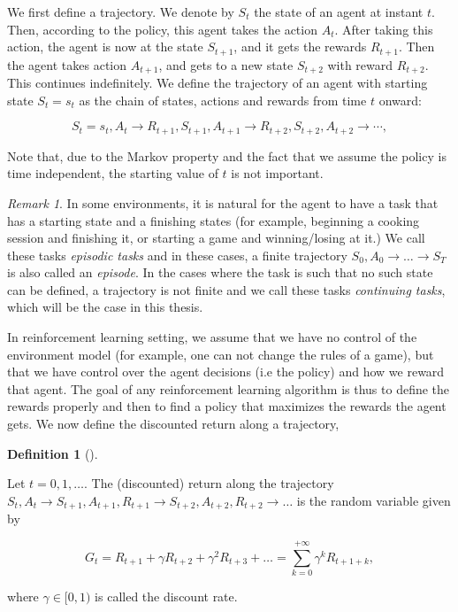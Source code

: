 \documentclass[
  letterpaper,
]{report}
\theoremstyle{plain}
\theoremstyle{definition}
\theoremstyle{definition}
\newtheorem{definition}{Definition}[chapter]
\theoremstyle{remark}
\newtheorem*{remark}{Remark}
\begin{document}
We first define a trajectory. We denote by \(S_t\) the state of an agent
at instant \(t\). Then, according to the policy, this agent takes the
action \(A_t\). After taking this action, the agent is now at the state
\(S_{t+1}\), and it gets the rewards \(R_{t+1}\). Then the agent takes
action \(A_{t+1}\), and gets to a new state \(S_{t+2}\) with reward
\(R_{t+2}\). This continues indefinitely. We define the trajectory of an
agent with starting state \(S_t = s_t\) as the chain of states, actions
and rewards from time \(t\) onward:

\[
S_t = s_t,A_t \to R_{t+1},S_{t+1},A_{t+1} \to R_{t+2},S_{t+2},A_{t+2} \to \cdots,
\]

Note that, due to the Markov property and the fact that we assume the
policy is time independent, the starting value of \(t\) is not
important.

\begin{remark}

In some environments, it is natural for the agent to have a task that
has a starting state and a finishing states (for example, beginning a
cooking session and finishing it, or starting a game and winning/losing
at it.) We call these tasks \emph{episodic tasks} and in these cases, a
finite trajectory \(S_0,A_0 \to \dots \to S_T\) is also called an
\emph{episode}. In the cases where the task is such that no such state
can be defined, a trajectory is not finite and we call these tasks
\emph{continuing tasks}, which will be the case in this thesis.

\end{remark}

In reinforcement learning setting, we assume that we have no control of
the environment model (for example, one can not change the rules of a
game), but that we have control over the agent decisions (i.e the
policy) and how we reward that agent. The goal of any reinforcement
learning algorithm is thus to define the rewards properly and then to
find a policy that maximizes the rewards the agent gets. We now define
the discounted return along a trajectory,

\leavevmode{}%
\begin{definition}[]\label{def-discount}

Let \(t = 0, 1, \dots\). The (discounted) return along the trajectory
\(S_t,A_t \to S_{t+1},A_{t+1}, R_{t+1} \to S_{t+2},A_{t+2}, R_{t+2} \to \dots\)
is the random variable given by

\[
G_t = R_{t+1} + \gamma R_{t+2} + \gamma^2 R_{t+3} + \dots = \sum_{k=0}^{+\infty}\gamma^k R_{t+1+k},
\]

where \(\gamma \in [0,1)\) is called the discount rate.

\end{definition}
\end{document}
